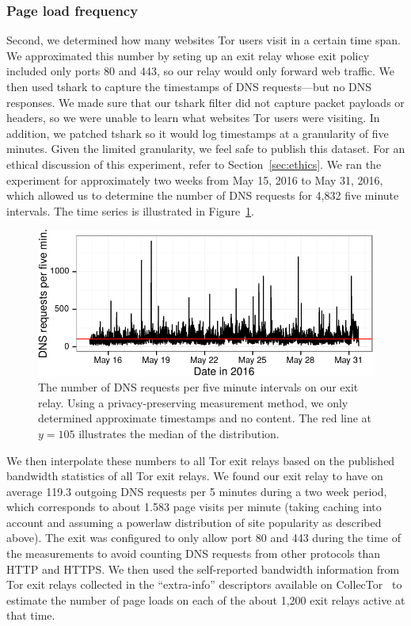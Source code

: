 \subsubsection{Page load frequency}
\label{sec:load-freq}
Second, we determined how many websites Tor users visit in a certain time span.
We approximated this number by seting up an exit relay whose exit policy
included only ports 80 and 443, so our relay would only forward web traffic.  We
then used tshark to capture the timestamps of DNS requests---but no DNS
responses.  We made sure that our tshark filter did not capture packet payloads
or headers, so we were unable to learn what websites Tor users were visiting.
In addition, we patched tshark so it would log timestamps at a granularity of
five minutes.  Given the limited granularity, we feel safe to publish this
dataset.  For an ethical discussion of this experiment, refer to
Section~\ref{sec:ethics}.  We ran the experiment for approximately two weeks
from May 15, 2016 to May 31, 2016, which allowed us to determine the number of
DNS requests for 4,832 five minute intervals.  The time series is illustrated in
Figure~\ref{fig:dns-reqs}.

\begin{figure}[t]
	\centering
	\includegraphics[width=\linewidth]{figures/dns-reqs.pdf}
	\caption{The number of DNS requests per five minute intervals on our
	exit relay.  Using a privacy-preserving measurement method, we only
	determined approximate timestamps and no content.  The red line at $y = 105$
	illustrates the median of the distribution.}
	\label{fig:dns-reqs}
\end{figure}

We then interpolate these numbers to all Tor exit relays based on the published
bandwidth statistics of all Tor exit relays. We found our exit relay to have on
average 119.3 outgoing DNS requests per 5 minutes during a two week period,
which corresponds to about 1.583 page visits per minute (taking caching into
account and assuming a powerlaw distribution of site popularity as described
above).  The exit was configured to only allow port 80 and 443 during the time
of the measurements to avoid counting DNS requests from other protocols than
HTTP and HTTPS. We then used the self-reported bandwidth information from Tor
exit relays collected in the ``extra-info'' descriptors available on
CollecTor~\cite{collector} to estimate the number of page loads on each of the
about 1,200 exit relays active at that time.

